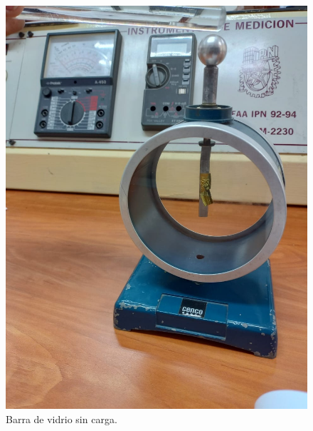 \documentclass[10pt]{article}
\begin{document}
\begin{multicols}{2}
\begin{figure}[h]
\centering
\includegraphics[scale=0.07]{p2}
\caption{Barra de vidrio sin carga.}

\end{figure}
\end{multicols}
\end{document}
